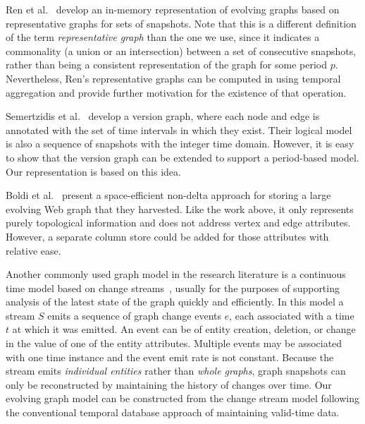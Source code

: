 Ren et al.~\cite{Ren2011} develop an in-memory representation of
evolving graphs based on representative graphs for sets of snapshots.
Note that this is a different definition of the term {\em
  representative graph} than the one we use, since it indicates a
commonality (a union or an intersection) between a set of consecutive
snapshots, rather than being a consistent representation of the graph
for some period $p$.  Nevertheless, Ren's representative graphs
can be computed in \ql using temporal aggregation and provide further
motivation for the existence of that operation.

Semertzidis et al.~\cite{Semertzidis2015} develop a version graph,
where each node and edge is annotated with the set of time intervals
in which they exist.  Their logical model is also a sequence of
snapshots with the integer time domain.  However, it is easy to show
that the version graph can be extended to support a period-based
model.  Our \og representation is based on this idea.

Boldi et al.~\cite{Boldi2008} present a space-efficient non-delta
approach for storing a large evolving Web graph that they harvested.
Like the work above, it only represents purely topological information
and does not address vertex and edge attributes.  However, a separate
column store could be added for those attributes with relative ease.

Another commonly used graph model in the research literature is a
continuous time model based on change
streams~\cite{Cheng2012,Ediger2012}, usually for the purposes of
supporting analysis of the latest state of the graph quickly and
efficiently.  In this model a stream $S$ emits a sequence of graph
change events $e$, each associated with a time $t$ at which it was
emitted.  An event can be of entity creation, deletion, or change in
the value of one of the entity attributes.  Multiple events may be
associated with one time instance and the event emit rate is not
constant.  Because the stream emits {\em individual entities} rather
than {\em whole graphs}, graph snapshots can only be reconstructed by
maintaining the history of changes over time.  Our evolving graph
model can be constructed from the change stream model following
the conventional temporal database approach of maintaining valid-time data.



